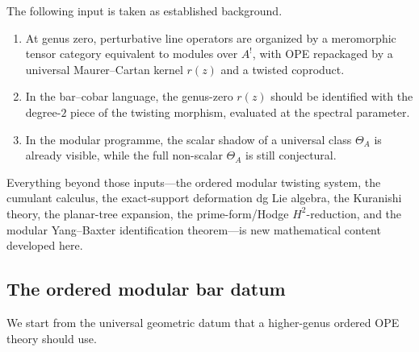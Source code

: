 \begin{remark}
The following input is taken as established background.
\begin{enumerate}
\item
At genus zero, perturbative line operators are organized by a meromorphic tensor category
equivalent to modules over $A^!$, with OPE repackaged by a universal Maurer--Cartan kernel $r(z)$
and a twisted coproduct.
\item
In the bar--cobar language, the genus-zero $r(z)$ should be identified with the degree-$2$
piece of the twisting morphism, evaluated at the spectral parameter.
\item
In the modular programme, the scalar shadow of a universal class $\Theta_A$ is already visible,
while the full non-scalar $\Theta_A$ is still conjectural.
\end{enumerate}
Everything beyond those inputs---the ordered modular twisting system, the cumulant calculus, the
exact-support deformation dg Lie algebra, the Kuranishi theory, the planar-tree expansion, the
prime-form/Hodge $H^2$-reduction, and the modular Yang--Baxter identification theorem---is new
mathematical content developed here.
\end{remark}

\subsection{The ordered modular bar datum}

We start from the universal geometric datum that a higher-genus ordered OPE theory should use.


